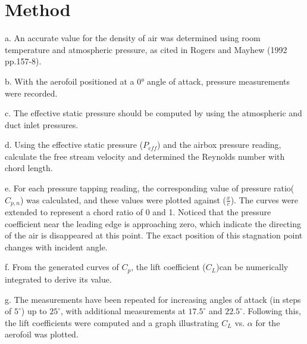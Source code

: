 \section{Method}
\FloatBarrier %

a. An accurate value for the density of air was determined using room temperature and atmospheric pressure, as cited in Rogers and Mayhew (1992 pp.157-8).

b. With the aerofoil positioned at a 0° angle of attack, pressure measurements were recorded.

c. The effective static pressure should be computed by using the atmospheric and duct inlet pressures.

d. Using the effective static pressure ($P_{eff}$) and the airbox pressure reading, calculate the free stream velocity and determined the Reynolds number with chord length. 

e. For each pressure tapping reading, the corresponding value of pressure ratio($C_{p,n}$) was calculated, and these values were plotted against ($\frac{x}{c}$). The curves were extended to represent a chord ratio of 0 and 1. Noticed that the pressure coefficient near the leading edge is approaching zero, which indicate the directing of the air is disappeared at this point. The exact position of this stagnation point changes with incident angle.

f. From the generated curves of $C_p$, the lift coefficient ($C_L$)can be numerically integrated to derive its value.

g. The measurements have been repeated for increasing angles of attack (in steps of $5^\circ$) up to $25^\circ$, with additional measurements at $17.5^\circ$ and $22.5^\circ$.
Following this, the lift coefficients were computed and a graph illustrating $C_L$ vs. $\alpha$ for the aerofoil was plotted.